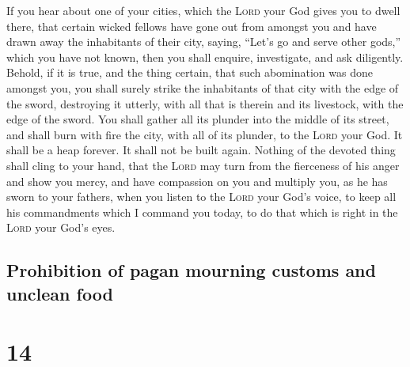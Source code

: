  If you hear about one of your cities, which the
\textsc{Lord} your God gives you to dwell there, that 
certain wicked fellows have gone out from amongst you and have drawn
away the inhabitants of their city, saying, ``Let's go and serve other
gods,'' which you have not known,  then you shall
enquire, investigate, and ask diligently. Behold, if it is true, and the
thing certain, that such abomination was done amongst you,
 you shall surely strike the inhabitants of that city
with the edge of the sword, destroying it utterly, with all that is
therein and its livestock, with the edge of the sword. 
You shall gather all its plunder into the middle of its street, and
shall burn with fire the city, with all of its plunder, to the
\textsc{Lord} your God. It shall be a heap forever. It shall not be
built again.  Nothing of the devoted thing shall cling to
your hand, that the \textsc{Lord} may turn from the fierceness of his
anger and show you mercy, and have compassion on you and multiply you,
as he has sworn to your fathers,  when you listen to the
\textsc{Lord} your God's voice, to keep all his commandments which I
command you today, to do that which is right in the \textsc{Lord} your
God's eyes.

\hypertarget{prohibition-of-pagan-mourning-customs-and-unclean-food}{%
\subsection{Prohibition of pagan mourning customs and unclean
food}\label{prohibition-of-pagan-mourning-customs-and-unclean-food}}

\hypertarget{section-13}{%
\section{14}\label{section-13}}

